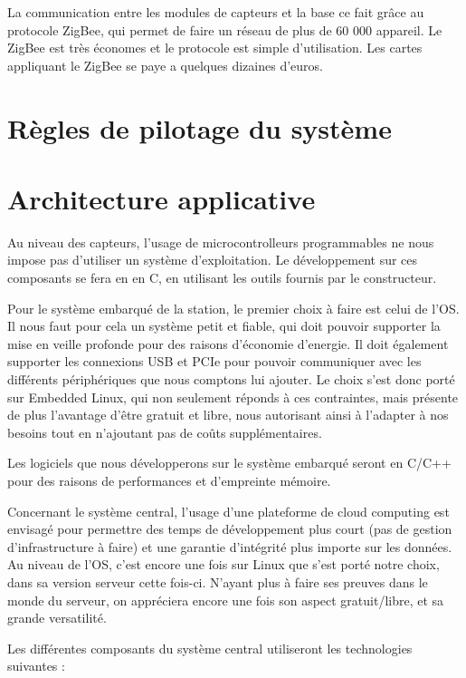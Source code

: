 La communication entre les modules de capteurs et la base ce fait grâce au protocole ZigBee, qui permet de faire un réseau de plus de 60 000 appareil. Le ZigBee est très économes et le protocole est simple d’utilisation. Les cartes appliquant le ZigBee se paye a quelques dizaines d’euros. 

\section{Règles de pilotage du système}

\section{Architecture applicative}

Au niveau des capteurs, l'usage de microcontrolleurs programmables ne nous impose pas d'utiliser un système d'exploitation. Le développement sur ces composants se fera en en C, en utilisant les outils fournis par le constructeur.

Pour le système embarqué de la station, le premier choix à faire est celui de l'OS. Il nous faut pour cela un système petit et fiable, qui doit pouvoir supporter la mise en veille profonde pour des raisons d'économie d'energie. Il doit également supporter les connexions USB et PCIe pour pouvoir communiquer avec les différents périphériques que nous comptons lui ajouter. Le choix s'est donc porté sur Embedded Linux, qui non seulement réponds à ces contraintes, mais présente de plus l'avantage d'être gratuit et libre, nous autorisant ainsi à l'adapter à nos besoins tout en n'ajoutant pas de coûts supplémentaires.

Les logiciels que nous développerons sur le système embarqué seront en C/C++ pour des raisons de performances et d'empreinte mémoire.

Concernant le système central, l'usage d'une plateforme de cloud computing est envisagé pour permettre des temps de développement plus court (pas de gestion d'infrastructure à faire) et une garantie d'intégrité plus importe sur les données. Au niveau de l'OS, c'est encore une fois sur Linux que s'est porté notre choix, dans sa version serveur cette fois-ci. N'ayant plus à faire ses preuves dans le monde du serveur, on appréciera encore une fois son aspect gratuit/libre, et sa grande versatilité.

Les différentes composants du système central utiliseront les technologies suivantes :

